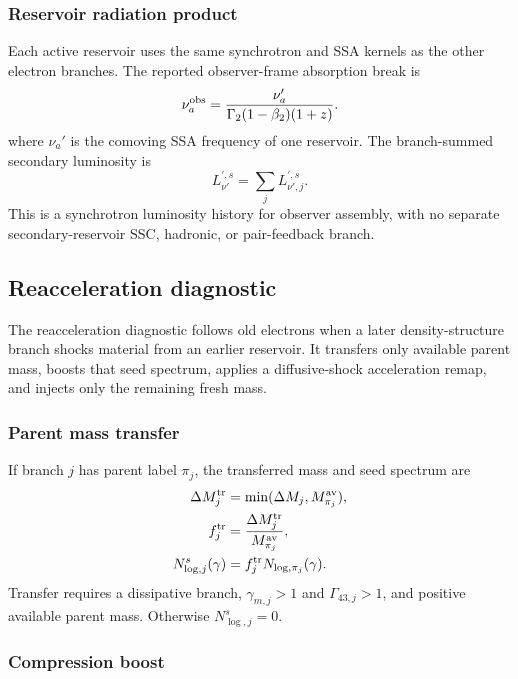 \documentclass[twocolumn]{aastex702}
\begin{document}
\subsubsection{Reservoir radiation product}

Each active reservoir uses the same synchrotron and SSA kernels as the other
electron branches.  The reported observer-frame absorption break is
\begin{equation}
\nu_a^{\rm obs}=
\frac{\nu_a'}
{\Gamma_2(1-\beta_2)(1+z)} .
\end{equation}
where \(\nu_a'\) is the comoving SSA frequency of one reservoir.  The
branch-summed secondary luminosity is
\begin{equation}
L_{\nu'}^{\prime,s}=\sum_jL_{\nu',j}^{\prime,s}.
\end{equation}
This is a synchrotron luminosity history for observer assembly, with no separate
secondary-reservoir SSC, hadronic, or pair-feedback branch.

\subsection{Reacceleration diagnostic}

The reacceleration diagnostic follows old electrons when a later density-structure
branch shocks material from an earlier reservoir.  It transfers only available
parent mass, boosts that seed spectrum, applies a diffusive-shock acceleration
remap, and injects only the remaining fresh mass.

\subsubsection{Parent mass transfer}

If branch \(j\) has parent label \(\pi_j\), the transferred mass and seed
spectrum are
\begin{equation}
\begin{aligned}
\Delta M_j^{\rm tr}&=\min(\Delta M_j,M_{\pi_j}^{\rm av}),\\
f_j^{\rm tr}&=\frac{\Delta M_j^{\rm tr}}{M_{\pi_j}^{\rm av}},\\
N_{\log,j}^{s}(\gamma)&=f_j^{\rm tr}N_{\log,\pi_j}(\gamma).
\end{aligned}
\end{equation}
Transfer requires a dissipative branch, \(\gamma_{m,j}>1\) and
\(\Gamma_{43,j}>1\), and positive available parent mass.  Otherwise
\(N_{\log,j}^{s}=0\).

\subsubsection{Compression boost}
\end{document}
